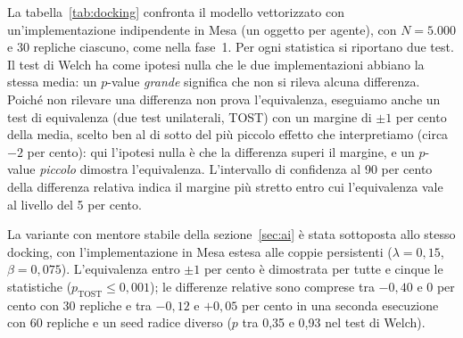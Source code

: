 \documentclass[preprint,12pt,authoryear]{elsarticle}
\begin{document}
La tabella~\ref{tab:docking} confronta il modello vettorizzato con un'implementazione indipendente in Mesa (un oggetto per agente), con $N=5.000$ e 30 repliche ciascuno, come nella fase~1. Per ogni statistica si riportano due test. Il test di Welch ha come ipotesi nulla che le due implementazioni abbiano la stessa media: un $p$-value \emph{grande} significa che non si rileva alcuna differenza. Poiché non rilevare una differenza non prova l'equivalenza, eseguiamo anche un test di equivalenza (due test unilaterali, TOST) con un margine di $\pm1$ per cento della media, scelto ben al di sotto del più piccolo effetto che interpretiamo (circa $-2$ per cento): qui l'ipotesi nulla è che la differenza superi il margine, e un $p$-value \emph{piccolo} dimostra l'equivalenza. L'intervallo di confidenza al 90 per cento della differenza relativa indica il margine più stretto entro cui l'equivalenza vale al livello del 5 per cento.

\begin{table}[h]\centering\small
\caption{Docking: implementazione vettorizzata (NumPy) contro implementazione a oggetti (Mesa) ($N=5.000$, 30 repliche ciascuna).}\label{tab:docking}
\end{table}

La variante con mentore stabile della sezione~\ref{sec:ai} è stata sottoposta allo stesso docking, con l'implementazione in Mesa estesa alle coppie persistenti ($\lambda=0{,}15$, $\beta=0{,}075$). L'equivalenza entro $\pm1$ per cento è dimostrata per tutte e cinque le statistiche ($p_{\mathrm{TOST}}\le0{,}001$); le differenze relative sono comprese tra $-0{,}40$ e $0$ per cento con 30 repliche e tra $-0{,}12$ e $+0{,}05$ per cento in una seconda esecuzione con 60 repliche e un seed radice diverso ($p$ tra 0,35 e 0,93 nel test di Welch).



\end{document}
